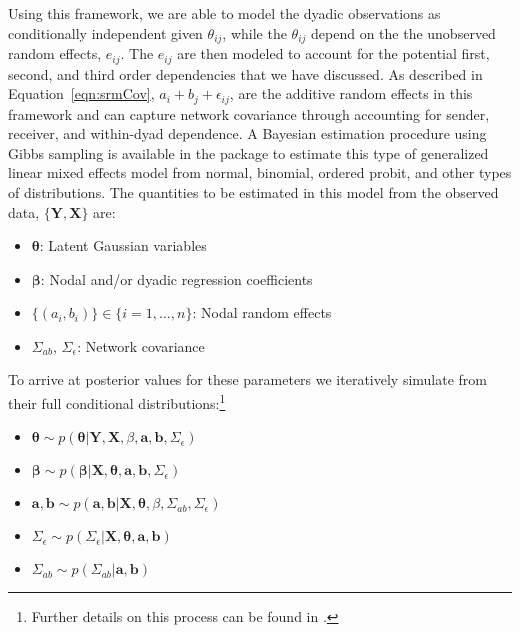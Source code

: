Using this framework, we are able to model the dyadic observations as conditionally independent given $\theta_{ij}$, while the $\theta_{ij}$ depend on the the unobserved random effects, $e_{ij}$. The $e_{ij}$ are then modeled to account for the potential first, second, and third order dependencies that we have discussed. As described in Equation~\ref{eqn:srmCov}, $a_{i} + b_{j}  + \epsilon_{ij}$, are the additive random effects in this framework and can capture network covariance through accounting for sender, receiver, and within-dyad dependence. A Bayesian estimation procedure using Gibbs sampling is available in the  package to estimate this type of generalized linear mixed effects model from normal, binomial, ordered probit, and other types of distributions. The quantities to be estimated in this model from the observed data, $\{\mathbf{Y}, \mathbf{X}\}$ are:

\begin{itemize}
	\item $\bm\theta$: Latent Gaussian variables
	\item $\bm\beta$: Nodal and/or dyadic regression coefficients
	\item $\{(a_{i},b_{i})\} \in \{i=1, \ldots, n \}$: Nodal random effects
	\item $\Sigma_{ab},\, \Sigma_{\epsilon}$: Network covariance
\end{itemize}

To arrive at posterior values for these parameters we iteratively simulate from their full conditional distributions:\footnote{Further details on this process can be found in \citet{hoff:2005}.}

\begin{itemize}
	\item $\bm\theta \sim p(\bm\theta | \mathbf{Y}, \mathbf{X}, \beta, \mathbf{a}, \mathbf{b}, \Sigma_{\epsilon})$	
	\item $\bm\beta \sim p(\bm\beta | \mathbf{X}, \bm\theta, \mathbf{a}, \mathbf{b}, \Sigma_{\epsilon})$
	\item $\mathbf{a}, \mathbf{b} \sim p(\mathbf{a}, \mathbf{b} | \mathbf{X}, \bm\theta, \beta, \Sigma_{ab}, \Sigma_{\epsilon})$
	\item $\Sigma_{\epsilon} \sim p(\Sigma_{\epsilon} | \mathbf{X}, \bm\theta, \mathbf{a}, \mathbf{b})$
	\item $\Sigma_{ab} \sim p(\Sigma_{ab} | \mathbf{a}, \mathbf{b})$
\end{itemize}

